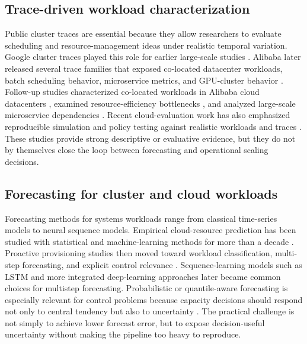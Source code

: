 \subsection{Trace-driven workload characterization}

Public cluster traces are essential because they allow researchers to evaluate scheduling and resource-management ideas under realistic temporal variation. Google cluster traces played this role for earlier large-scale studies \citep{reiss2012google}. Alibaba later released several trace families that exposed co-located datacenter workloads, batch scheduling behavior, microservice metrics, and GPU-cluster behavior \citep{alibabaclusterdata2026}. Follow-up studies characterized co-located workloads in Alibaba cloud datacenters \citep{Jiang2022Characterizing}, examined resource-efficiency bottlenecks \citep{guo2019limits}, and analyzed large-scale microservice dependencies \citep{luo2021characterizing}. Recent cloud-evaluation work has also emphasized reproducible simulation and policy testing against realistic workloads and traces \citep{Canizares2023Simcan2Cloud}. These studies provide strong descriptive or evaluative evidence, but they do not by themselves close the loop between forecasting and operational scaling decisions.

\subsection{Forecasting for cluster and cloud workloads}

Forecasting methods for systems workloads range from classical time-series models to neural sequence models. Empirical cloud-resource prediction has been studied with statistical and machine-learning methods for more than a decade \citep{islam2012empirical,Dinda2000HostLoad,Calheiros2015ARIMAWorkload}. Proactive provisioning studies then moved toward workload classification, multi-step forecasting, and explicit control relevance \citep{Herbst2014ProactiveProvisioning,Baldan2018WorkloadForecasting,Banerjee2021MultiStepPrediction}. Sequence-learning models such as LSTM \citep{hochreiter1997long,Song2017LSTMHostLoad} and more integrated deep-learning approaches \citep{Bi2021IntegratedDeepLearning} later became common choices for multistep forecasting. Probabilistic or quantile-aware forecasting is especially relevant for control problems because capacity decisions should respond not only to central tendency but also to uncertainty \citep{salinas2020deepar,lim2021temporal,Rossi2025UncertaintyAwareForecasting}. The practical challenge is not simply to achieve lower forecast error, but to expose decision-useful uncertainty without making the pipeline too heavy to reproduce.

